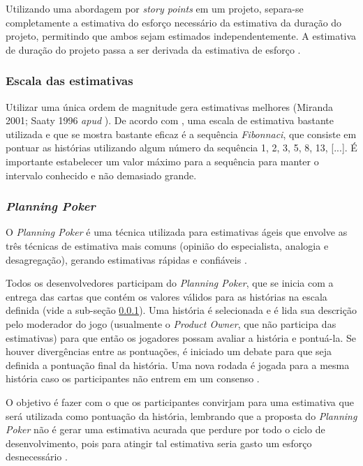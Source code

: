 	Utilizando uma abordagem por \textit{story points} em um projeto, separa-se completamente a estimativa do esforço
	necessário da estimativa da duração do projeto, permitindo que ambos sejam estimados independentemente. A estimativa de
	duração do projeto passa a ser derivada da estimativa de esforço \cite{cohn06}.

      \subsubsection{Escala das estimativas}
      \label{estimation_scales}

	  Utilizar uma única ordem de magnitude gera estimativas melhores (Miranda 2001; Saaty 1996 \textit{apud} \cite{cohn06}).
	  De acordo com , uma escala de estimativa bastante utilizada e que se mostra bastante eficaz é a
	  sequência \textit{Fibonnaci}, que consiste em pontuar as histórias utilizando algum número da
	  sequência 1, 2, 3, 5, 8, 13, [...]. É importante estabelecer um valor máximo para a sequência para manter o intervalo
	  conhecido e não demasiado grande.

      \subsubsection{\textit{Planning Poker}}

	O \textit{Planning Poker} é uma técnica utilizada para estimativas ágeis que envolve as três técnicas de estimativa
	mais comuns (opinião do especialista, analogia e desagregação), gerando estimativas rápidas e confiáveis \cite{cohn06}.

	Todos os desenvolvedores participam do \textit{Planning Poker}, que se inicia com a entrega das cartas que contém os
	valores válidos para as histórias na escala definida (vide a sub-seção \ref{estimation_scales}).
	Uma história é selecionada e é lida sua descrição pelo moderador
	do jogo (usualmente o \textit{Product Owner}, que não participa das estimativas) para que então os jogadores possam
	avaliar a história e pontuá-la. Se houver divergências entre as pontuações, é iniciado um debate para que seja definida
	a pontuação final da história. Uma nova rodada é jogada para a mesma história caso os participantes não
	entrem em um consenso \cite{grenning02}.

	O objetivo é fazer com o que os participantes convirjam para uma estimativa que será utilizada como pontuação da
	história, lembrando que a proposta do \textit{Planning Poker} não é gerar uma estimativa acurada que perdure por
	todo o ciclo de desenvolvimento, pois para atingir tal estimativa seria gasto um esforço
	desnecessário \cite{cohn06} \cite{grenning02}.

